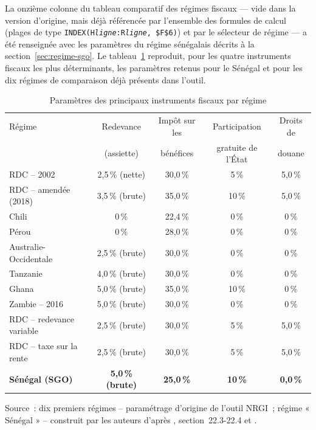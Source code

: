 La onzième colonne du tableau comparatif des régimes fiscaux --- vide dans la version d'origine, mais déjà référencée par l'ensemble des formules de calcul (plages de type \texttt{INDEX(H\textit{ligne}:R\textit{ligne}, \$F\$6)}) et par le sélecteur de régime --- a été renseignée avec les paramètres du régime sénégalais décrits à la section~\ref{sec:regime-sgo}. Le tableau~\ref{tab:regimes} reproduit, pour les quatre instruments fiscaux les plus déterminants, les paramètres retenus pour le Sénégal et pour les dix régimes de comparaison déjà présents dans l'outil.

\begin{table}[H]
\centering
\caption{Paramètres des principaux instruments fiscaux par régime}
\label{tab:regimes}
\small
\begin{tabular}{lcccc}
\toprule
Régime & Redevance & Impôt sur les & Participation & Droits de \\
       & (assiette) & bénéfices & gratuite de l'État & douane \\
\midrule
RDC -- 2002            & 2,5\,\% (nette) & 30,0\,\% & 5\,\%  & 5,0\,\% \\
RDC -- amendée (2018)  & 3,5\,\% (brute) & 35,0\,\% & 10\,\% & 5,0\,\% \\
Chili                  & 0\,\%           & 22,4\,\% & 0\,\%  & 0\,\% \\
Pérou                  & 0\,\%           & 28,0\,\% & 0\,\%  & 0\,\% \\
Australie-Occidentale  & 2,5\,\% (brute) & 30,0\,\% & 0\,\%  & 0\,\% \\
Tanzanie               & 4,0\,\% (brute) & 30,0\,\% & 0\,\%  & 0\,\% \\
Ghana                  & 5,0\,\% (brute) & 35,0\,\% & 10\,\% & 0\,\% \\
Zambie -- 2016         & 5,0\,\% (brute) & 30,0\,\% & 0\,\%  & 0\,\% \\
RDC -- redevance variable & 2,5\,\% (brute) & 30,0\,\% & 5\,\% & 5,0\,\% \\
RDC -- taxe sur la rente  & 2,5\,\% (brute) & 30,0\,\% & 5\,\% & 5,0\,\% \\
\textbf{Sénégal (SGO)} & \textbf{5,0\,\% (brute)} & \textbf{25,0\,\%} & \textbf{10\,\%} & \textbf{0,0\,\%} \\
\bottomrule
\end{tabular}

\vspace{0.2cm}
\footnotesize Source~: dix premiers régimes -- paramétrage d'origine de l'outil NRGI~; régime « Sénégal » -- construit par les auteurs d'après \citet{lycopodium2020pfs}, section~22.3-22.4 et \citet{senegal2016codeminier}.
\end{table}

